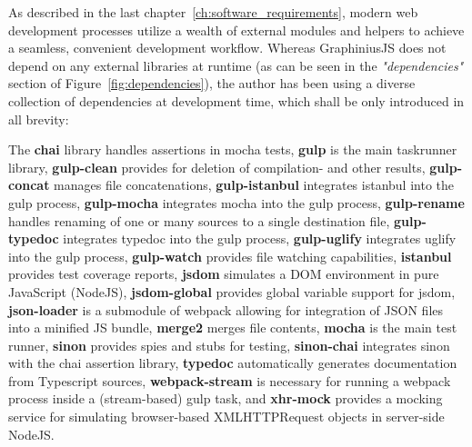 	As described in the last chapter~\ref{ch:software_requirements}, modern web development processes utilize a wealth of external modules and helpers to achieve a seamless, convenient development workflow. Whereas GraphiniusJS does not depend on any external libraries at runtime (as can be seen in the \textit{"dependencies"} section of Figure~\ref{fig:dependencies}), the author has been using a diverse collection of dependencies at development time, which shall be only introduced in all brevity:
	
	The \textbf{chai} library handles assertions in mocha tests, \textbf{gulp} is the main taskrunner library, \textbf{gulp-clean} provides for deletion of compilation- and other results, \textbf{gulp-concat} manages file concatenations, \textbf{gulp-istanbul} integrates istanbul into the gulp process, \textbf{gulp-mocha} integrates mocha into the gulp process, \textbf{gulp-rename} handles renaming of one or many sources to a single destination file, \textbf{gulp-typedoc} integrates typedoc into the gulp process, \textbf{gulp-uglify} integrates uglify into the gulp process, \textbf{gulp-watch} provides file watching capabilities, \textbf{istanbul} provides test coverage reports, \textbf{jsdom} simulates a DOM environment in pure JavaScript (NodeJS), \textbf{jsdom-global} provides global variable support for jsdom, \textbf{json-loader} is a submodule of webpack allowing for integration of JSON files into a minified JS bundle, \textbf{merge2} merges file contents, \textbf{mocha} is the main test runner, \textbf{sinon} provides spies and stubs for testing, \textbf{sinon-chai} integrates sinon with the chai assertion library, \textbf{typedoc} automatically generates documentation from Typescript sources, \textbf{webpack-stream} is necessary for running a webpack process inside a (stream-based) gulp task, and \textbf{xhr-mock} provides a mocking service for simulating browser-based XMLHTTPRequest objects in server-side NodeJS.

